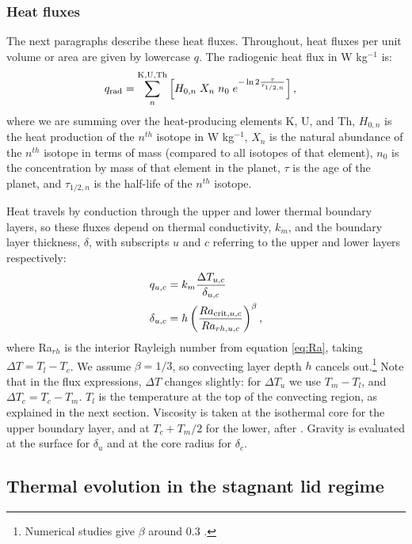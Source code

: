 \subsubsection{Heat fluxes}
The next paragraphs describe these heat fluxes. Throughout, heat fluxes per unit volume or area are given by lowercase $q$. The radiogenic heat flux in W kg$^{-1}$ is:
\begin{align}
q_{\rm rad} &= \sum^{\rm K, U, Th}_n \left[ H_{0, n} \; X_n \; n_0 \; e^{-\ln 2 \frac{\tau}{\tau_{1/2 ,n}}} \right],
\end{align}
where we are summing over the heat-producing elements K, U, and Th, $H_{0, n}$ is the heat production of the $n^{th}$ isotope in W kg$^{-1}$, $X_n$ is the natural abundance of the $n^{th}$ isotope in terms of mass (compared to all isotopes of that element), $n_0$ is the concentration by mass of that element in the planet, $\tau$ is the age of the planet, and $\tau_{1/2 ,n}$ is the half-life of the $n^{th}$ isotope.

Heat travels by conduction through the upper and lower thermal boundary layers, so these fluxes depend on thermal conductivity, $k_m$, and the boundary layer thickness, $\delta$, with subscripts $u$ and $c$ referring to the upper and lower layers respectively: 
\begin{align}
q_{u, c} &= k_m \frac{\Delta T_{u, c}}{\delta_{u, c}} \\
\delta_{u, c} &= h \left(\frac{Ra_{{\rm crit}, u, c}}{Ra_{rh, u, c}}\right)^\beta,
\end{align}
where Ra$_{rh}$ is the interior Rayleigh number from equation \ref{eq:Ra}, taking $\Delta T = T_l - T_c$. We assume $\beta = 1/3$, so convecting layer depth $h$ cancels out.\footnote{Numerical studies give $\beta$ around 0.3 \citep{Thiriet2019}.} Note that in the flux expressions, $\Delta T$ changes slightly: for $\Delta T_u$ we use $T_m - T_l$, and $\Delta T_c = T_c - T_m$. $T_l$ is the temperature at the top of the convecting region, as explained in the next section. Viscosity is taken at the isothermal core for the upper boundary layer, and at $T_c + T_m/2$ for the lower, after \citet{Thiriet2019}. Gravity is evaluated at the surface for $\delta_u$ and at the core radius for $\delta_c$.




\subsection{Thermal evolution in the stagnant lid regime}

